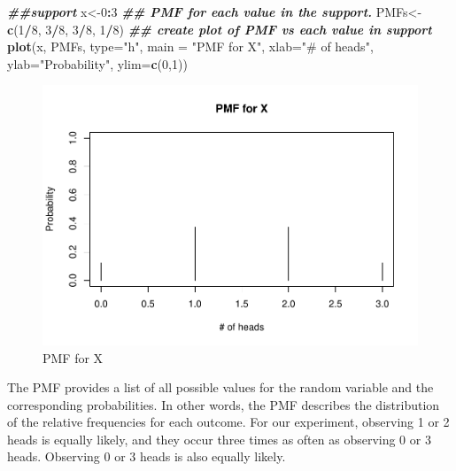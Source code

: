 \documentclass[
]{book}
\newenvironment{Shaded}{\begin{snugshade}}{\end{snugshade}}
\newcommand{\AttributeTok}[1]{\textcolor[rgb]{0.13,0.29,0.53}{#1}}
\newcommand{\DecValTok}[1]{\textcolor[rgb]{0.00,0.00,0.81}{#1}}
\newcommand{\DocumentationTok}[1]{\textcolor[rgb]{0.56,0.35,0.01}{\textbf{\textit{#1}}}}
\newcommand{\FunctionTok}[1]{\textcolor[rgb]{0.13,0.29,0.53}{\textbf{#1}}}
\newcommand{\NormalTok}[1]{#1}
\newcommand{\OtherTok}[1]{\textcolor[rgb]{0.56,0.35,0.01}{#1}}
\newcommand{\SpecialCharTok}[1]{\textcolor[rgb]{0.81,0.36,0.00}{\textbf{#1}}}
\newcommand{\StringTok}[1]{\textcolor[rgb]{0.31,0.60,0.02}{#1}}
\begin{document}
\begin{Shaded}
\begin{Highlighting}[]
\DocumentationTok{\#\#support}
\NormalTok{x}\OtherTok{\textless{}{-}}\DecValTok{0}\SpecialCharTok{:}\DecValTok{3}
\DocumentationTok{\#\# PMF for each value in the support. }
\NormalTok{PMFs}\OtherTok{\textless{}{-}}\FunctionTok{c}\NormalTok{(}\DecValTok{1}\SpecialCharTok{/}\DecValTok{8}\NormalTok{, }\DecValTok{3}\SpecialCharTok{/}\DecValTok{8}\NormalTok{, }\DecValTok{3}\SpecialCharTok{/}\DecValTok{8}\NormalTok{, }\DecValTok{1}\SpecialCharTok{/}\DecValTok{8}\NormalTok{)}
\DocumentationTok{\#\# create plot of PMF vs each value in support}
\FunctionTok{plot}\NormalTok{(x, PMFs, }\AttributeTok{type=}\StringTok{"h"}\NormalTok{, }\AttributeTok{main =} \StringTok{"PMF for X"}\NormalTok{, }\AttributeTok{xlab=}\StringTok{"\# of heads"}\NormalTok{, }\AttributeTok{ylab=}\StringTok{"Probability"}\NormalTok{, }\AttributeTok{ylim=}\FunctionTok{c}\NormalTok{(}\DecValTok{0}\NormalTok{,}\DecValTok{1}\NormalTok{))}
\end{Highlighting}
\end{Shaded}

\begin{figure}
\centering
\includegraphics{bookdown-demo_files/figure-latex/3-pmf-1.pdf}
\caption{\label{fig:3-pmf}PMF for X}
\end{figure}

The PMF provides a list of all possible values for the random variable and the corresponding probabilities. In other words, the PMF describes the distribution of the relative frequencies for each outcome. For our experiment, observing 1 or 2 heads is equally likely, and they occur three times as often as observing 0 or 3 heads. Observing 0 or 3 heads is also equally likely.
\end{document}
